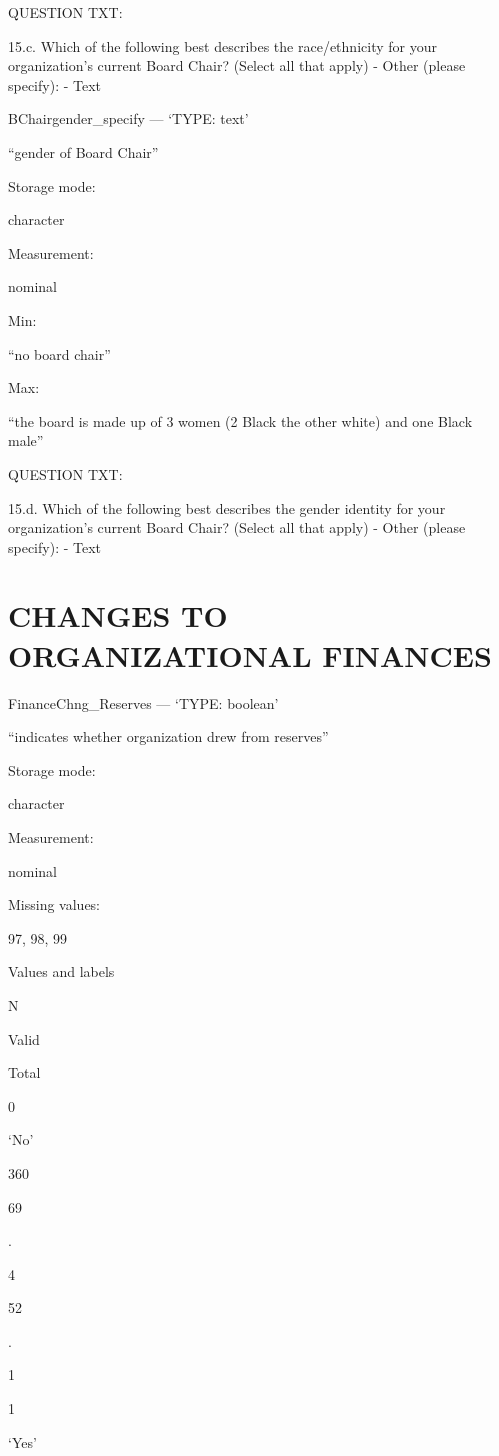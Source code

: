 \documentclass[
  letterpaper,
]{scrbook}
\begin{document}
QUESTION TXT:

15.c. Which of the following best describes the race/ethnicity for your
organization's current Board Chair? (Select all that apply) - Other
(please specify): - Text

BChairgender\_specify --- {`TYPE: text'}

``gender of Board Chair''

Storage mode:

character

Measurement:

nominal

Min:

``no board chair''

Max:

``the board is made up of 3 women (2 Black the other white) and one
Black male''

QUESTION TXT:

15.d. Which of the following best describes the gender identity for your
organization's current Board Chair? (Select all that apply) - Other
(please specify): - Text

\chapter{CHANGES TO ORGANIZATIONAL
FINANCES}\label{changes-to-organizational-finances}

FinanceChng\_Reserves --- {`TYPE: boolean'}

``indicates whether organization drew from reserves''

Storage mode:

character

Measurement:

nominal

Missing values:

97, 98, 99

Values and labels

N

Valid

Total

0

`No'

360

69

.

4

52

.

1

1

`Yes'
\end{document}
